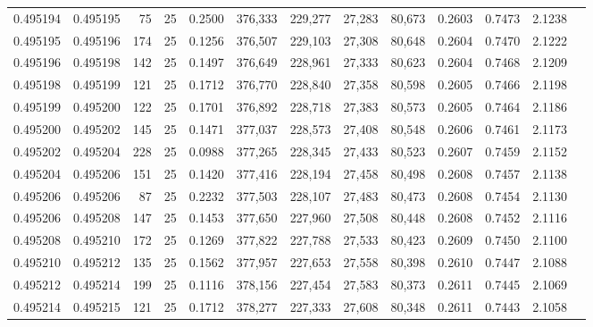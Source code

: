 \begin{tabular}{rrrrrrrrrrrrr}
0.495194 & 0.495195 &    75 &  25 &                                     0.2500 & 376,333 & 229,277 &  27,283 &  80,673 & 0.2603 & 0.7473 & 2.1238 \\
0.495195 & 0.495196 &   174 &  25 &                                     0.1256 & 376,507 & 229,103 &  27,308 &  80,648 & 0.2604 & 0.7470 & 2.1222 \\
0.495196 & 0.495198 &   142 &  25 &                                     0.1497 & 376,649 & 228,961 &  27,333 &  80,623 & 0.2604 & 0.7468 & 2.1209 \\
0.495198 & 0.495199 &   121 &  25 &                                     0.1712 & 376,770 & 228,840 &  27,358 &  80,598 & 0.2605 & 0.7466 & 2.1198 \\
0.495199 & 0.495200 &   122 &  25 &                                     0.1701 & 376,892 & 228,718 &  27,383 &  80,573 & 0.2605 & 0.7464 & 2.1186 \\
0.495200 & 0.495202 &   145 &  25 &                                     0.1471 & 377,037 & 228,573 &  27,408 &  80,548 & 0.2606 & 0.7461 & 2.1173 \\
0.495202 & 0.495204 &   228 &  25 &                                     0.0988 & 377,265 & 228,345 &  27,433 &  80,523 & 0.2607 & 0.7459 & 2.1152 \\
0.495204 & 0.495206 &   151 &  25 &                                     0.1420 & 377,416 & 228,194 &  27,458 &  80,498 & 0.2608 & 0.7457 & 2.1138 \\
0.495206 & 0.495206 &    87 &  25 &                                     0.2232 & 377,503 & 228,107 &  27,483 &  80,473 & 0.2608 & 0.7454 & 2.1130 \\
0.495206 & 0.495208 &   147 &  25 &                                     0.1453 & 377,650 & 227,960 &  27,508 &  80,448 & 0.2608 & 0.7452 & 2.1116 \\
0.495208 & 0.495210 &   172 &  25 &                                     0.1269 & 377,822 & 227,788 &  27,533 &  80,423 & 0.2609 & 0.7450 & 2.1100 \\
0.495210 & 0.495212 &   135 &  25 &                                     0.1562 & 377,957 & 227,653 &  27,558 &  80,398 & 0.2610 & 0.7447 & 2.1088 \\
0.495212 & 0.495214 &   199 &  25 &                                     0.1116 & 378,156 & 227,454 &  27,583 &  80,373 & 0.2611 & 0.7445 & 2.1069 \\
0.495214 & 0.495215 &   121 &  25 &                                     0.1712 & 378,277 & 227,333 &  27,608 &  80,348 & 0.2611 & 0.7443 & 2.1058 \\

\end{tabular}
